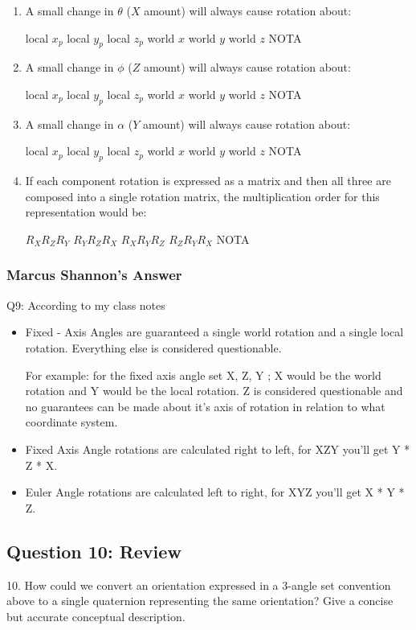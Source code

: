 \documentclass[11pt]{article}
\begin{document}
\begin{spacing}{1.2}
\begin{enumerate}[label=\arabic*)]
	\item A small change in $\theta$ ($X$ amount) will always cause rotation about:
	
	local $x_p$ \qquad local $y_p$ \qquad local $z_p$ \qquad world $x$ \qquad world $y$ \qquad world $z$ \qquad NOTA
	\item A small change in $\phi$ ($Z$ amount) will always cause rotation about:
	
	local $x_p$ \qquad local $y_p$ \qquad local $z_p$ \qquad world $x$ \qquad world $y$ \qquad world $z$ \qquad NOTA
	
	\item A small change in $\alpha$ ($Y$ amount) will always cause rotation about:
	
	local $x_p$ \qquad local $y_p$ \qquad local $z_p$ \qquad world $x$ \qquad world $y$ \qquad world $z$ \qquad NOTA
	\item If each component rotation is expressed as a matrix and then all three are composed into a single rotation matrix, the multiplication order for this representation would be:
	
	$R_XR_ZR_Y$ \qquad
	$R_YR_ZR_X$ \qquad
	$R_XR_YR_Z$ \qquad
	$R_ZR_YR_X$ \qquad
	NOTA
\end{enumerate}


\subsubsection{Marcus Shannon's Answer}
Q9: According to my class notes

\begin{itemize}
	\item Fixed - Axis Angles are guaranteed a single world rotation and a single local rotation. Everything else is considered questionable.

      For example: for the fixed axis angle set X, Z, Y ; X would be the world rotation and Y would be the local rotation. Z is considered questionable and no guarantees can be made about it's axis of rotation in relation to what coordinate system.
    \item Fixed Axis Angle rotations are calculated right to left, for XZY you'll get Y * Z * X.
    \item Euler Angle rotations are calculated left to right, for XYZ you'll get X * Y * Z.
\end{itemize}

\subsection{Question 10:  Review}
10.  How could we convert an orientation expressed in a 3-angle set convention above to a single quaternion representing the same orientation?  Give a concise but accurate conceptual description.


\end{spacing}
\end{document}
